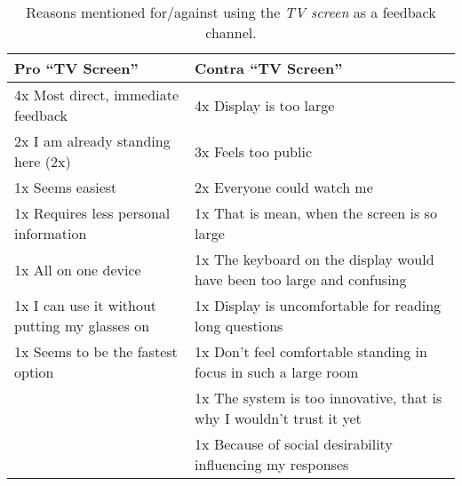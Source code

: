   \begin{table}[h]
    \small
    \center

    \begin{tabular}{p{7cm}p{7cm}}
    \toprule
    \textbf{Pro ``TV Screen''}  &  \textbf{Contra ``TV Screen''} \\ \midrule

    4x Most direct, immediate feedback  &  4x Display is too large  \\
    2x I am already standing here (2x)  &  3x Feels too public  \\
    1x Seems easiest  &  2x Everyone could watch me  \\
    1x Requires less personal information  &  1x That is mean, when the screen is so large  \\
    1x All on one device  &  1x The keyboard on the display would have been too large and confusing  \\
    1x I can use it without putting my glasses on  &  1x Display is uncomfortable for reading long questions  \\
    1x Seems to be the fastest option  &  1x Don't feel comfortable standing in focus in such a large room  \\

      &  1x The system is too innovative, that is why I wouldn't trust it yet \\
      &  1x Because of social desirability influencing my responses  \\

    \bottomrule
    \end{tabular}

    \caption[Feedback Channel - TV Screen]{Reasons mentioned for/against using the \textit{TV screen} as a feedback channel.}
    \label{table:feedback-channel-TV-screen}
  \end{table}

 


